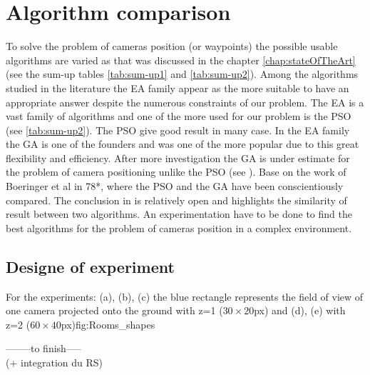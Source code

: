 \section{Algorithm comparison }\label{sec:GAvsPSO} 
%
To solve the problem of cameras position (or waypoints) the possible usable algorithms are varied as that was discussed in the chapter \ref{chap:stateOfTheArt} (see the sum-up tables \ref{tab:sum-up1} and \ref{tab:sum-up2}).
Among the algorithms studied in the literature the EA family appear as the more suitable to have an appropriate answer despite the numerous constraints of our problem. The EA is a vast family of algorithms and one of the more used for our problem is the PSO (see \ref{tab:sum-up2}). The PSO give good result in many case. In the EA family the GA is one of the founders and was one of the more popular due to this great flexibility and efficiency.
 After more investigation the GA is under estimate for the problem of camera positioning unlike the PSO (see \citep{33*reddy2012,8*zhou2011,84*xu2011,143*maji2015,193*fu2014,194*fu2010}).
 Base on the work of Boeringer et al in \citep{78*boeringer2004}78*, where the PSO and the GA have been conscientiously compared. The conclusion in \citep{78*boeringer2004} is relatively open and highlights the similarity of result between two algorithms. An experimentation have to be done to find the best algorithms for the problem of cameras position in a complex environment. 




\subsection{Designe of experiment }\label{sec:DoE}
\begin{mfigures}[!]{For the experiments: (a), (b), (c) the blue rectangle represents the field of view of one camera projected onto the ground  with z=1 ($30 \times 20 $px) and (d), (e) with z=2 ($60 \times 40 $px)}{fig:Rooms_shapes} \centering
{}
\hspace{1cm}
\hspace{1cm}
\end{mfigures}
--------to finish-----\\ (+ integration du RS)\\

